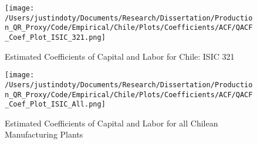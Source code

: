 \documentclass[11pt]{article}
\begin{document}
\begin{figure}[H]
\centering
\caption{Estimated Coefficients of Capital and Labor for Chile: ISIC 321}
\texttt{[image: /Users/justindoty/Documents/Research/Dissertation/Production\_QR\_Proxy/Code/Empirical/Chile/Plots/Coefficients/ACF/QACF\_Coef\_Plot\_ISIC\_321.png]}
\label{fig:ACFCHL321}
\end{figure}

\begin{figure}[H]
\centering
\caption{Estimated Coefficients of Capital and Labor for all Chilean Manufacturing Plants}
\texttt{[image: /Users/justindoty/Documents/Research/Dissertation/Production\_QR\_Proxy/Code/Empirical/Chile/Plots/Coefficients/ACF/QACF\_Coef\_Plot\_ISIC\_All.png]}
\label{fig:ACFCHLall}
\end{figure}
\end{document}

